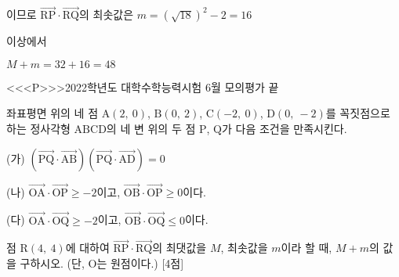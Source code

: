 \documentclass{oblivoir}
\begin{document}
이므로 $\overrightarrow{\mathrm{RP}}\cdot\overrightarrow{\mathrm{RQ}}$의 최솟값은 $m=(\sqrt{18})^{2}- 2 = 16$

이상에서 

$M + m = 32+ 16 = 48$

<<<P>>>2022학년도 대학수학능력시험 6월 모의평가 끝

좌표평면 위의 네 점 $\mathrm{A}(2,\: 0)$, $\mathrm{B}(0,\:  2)$, $\mathrm{C}(-2,\: 0)$, $\mathrm{D}(0,\: -2)$를 꼭짓점으로 하는 정사각형 $\mathrm{ABCD}$의 네 변 위의 두 점 $\mathrm{P}$, $\mathrm{Q}$가 다음 조건을 만족시킨다.

(가) $(\overrightarrow{\mathrm{PQ}}\cdot\overrightarrow{\mathrm{AB}})(\overrightarrow{\mathrm{PQ}}\cdot\overrightarrow{\mathrm{AD}})= 0$

(나) $\overrightarrow{\mathrm{OA}}\cdot\overrightarrow{\mathrm{OP}}\ge -2$이고, $\overrightarrow{\mathrm{OB}}\cdot\overrightarrow{\mathrm{OP}}\ge 0$이다.

(다) $\overrightarrow{\mathrm{OA}}\cdot\overrightarrow{\mathrm{OQ}}\ge -2$이고, $\overrightarrow{\mathrm{OB}}\cdot\overrightarrow{\mathrm{OQ}}\le 0$이다.

점 $\mathrm{R}(4,\: 4)$에 대하여 $\overrightarrow{\mathrm{RP}}\cdot\overrightarrow{\mathrm{RQ}}$의 최댓값을 $M$, 최솟값을 $m$이라 할 때, $M+m$의 값을 구하시오. (단, $\mathrm{O}$는 원점이다.) [4점]
\end{document}

